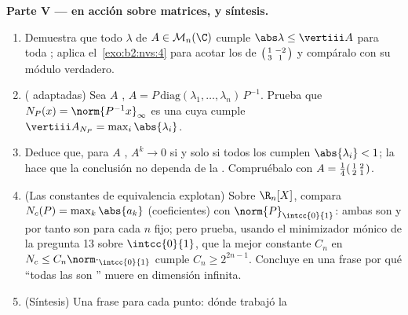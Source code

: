 \begin{problem}
\medskip
\noindent\textbf{Parte V ---  en acción sobre matrices, y
síntesis.}
\begin{enumerate}[resume]
  \item Demuestra que todo  $\lambda$ de $A \in
        \mathcal{M}_n(\C)$ cumple $\abs\lambda \leq \vertiii A$ para
        toda ; aplica el~\cref{exo:b2:nvs:4} para
        acotar los  de
        $\begin{psmallmatrix}1 & -2\\ 3 & 1\end{psmallmatrix}$ y
        compáralo con su módulo verdadero.
  \item ( adaptadas) Sea $A$ , $A =
        P\,\mathrm{diag}(\lambda_1, \dots, \lambda_n)\,P^{-1}$.
        Prueba que $N_P(x) = \norm{P^{-1}x}_\infty$ es una 
        cuya  cumple $\vertiii A_{N_P} =
        \max_i\abs{\lambda_i}$.
  \item Deduce que, para $A$ , $A^k \to 0$ si y solo
        si todos los  cumplen $\abs{\lambda_i} < 1$;
        la  hace que la conclusión no dependa
        de la . Compruébalo con $A =
        \frac14\begin{psmallmatrix}1 & 2\\ 2 &
        1\end{psmallmatrix}$.
  \item (Las constantes de equivalencia explotan) Sobre $\R_n[X]$,
        compara $N_c(P) = \max_k \abs{a_k}$ (coeficientes) con
        $\norm{P}_{\intcc{0}{1}}$: ambas son  y por tanto son
         para cada $n$ fijo; pero prueba, usando el
        minimizador mónico de la pregunta 13 sobre $\intcc{0}{1}$,
        que la mejor constante $C_n$ en $N_c \leq
        C_n\norm\cdot_{\intcc{0}{1}}$ cumple $C_n \geq 2^{2n-1}$.
        Concluye en una frase por qué ``todas las  son
        '' muere en dimensión infinita.
  \item (Síntesis) Una frase para cada punto: dónde trabajó la

\end{enumerate}
\end{problem}
